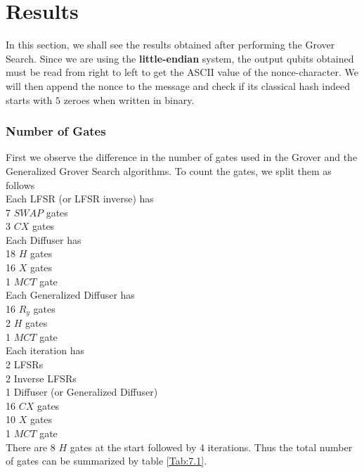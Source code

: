 \section{Results}
In this section, we shall see the results obtained after performing the Grover Search. Since we are using the \textbf{little-endian} system, the output qubits obtained must be read from right to left to get the ASCII value of the nonce-character. We will then append the nonce to the message and check if its classical hash indeed starts with $5$ zeroes when written in binary.

\subsubsection*{Number of Gates}
\noindent First we observe the difference in the number of gates used in the Grover and the Generalized Grover Search algorithms. To count the gates, we split them as follows\\

\noindent Each LFSR (or LFSR inverse) has\\
7 $SWAP$ gates\\
3 $CX$ gates\\

\noindent Each Diffuser has\\
18 $H$ gates\\
16 $X$ gates\\
1 $MCT$ gate\\

\noindent Each Generalized Diffuser has\\
16 $R_y$ gates\\
2 $H$ gates\\
1 $MCT$ gate\\

\noindent Each iteration has\\
2 LFSRs\\
2 Inverse LFSRs\\
1 Diffuser (or Generalized Diffuser)\\
16 $CX$ gates\\
10 $X$ gates\\
1 $MCT$ gate\\

There are 8 $H$ gates at the start followed by 4 iterations. Thus the total number of gates can be summarized by table \ref{Tab:7.1}.

